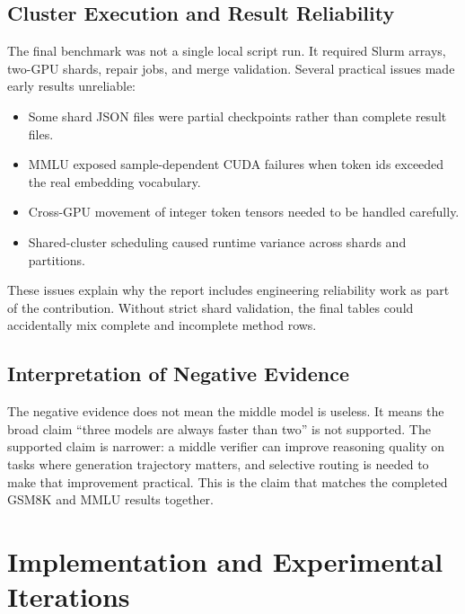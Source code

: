 \documentclass[11pt]{article}
\begin{document}
\subsection{Cluster Execution and Result Reliability}

The final benchmark was not a single local script run. It required Slurm arrays, two-GPU shards, repair jobs, and merge validation. Several practical issues made early results unreliable:

\begin{itemize}
  \item Some shard JSON files were partial checkpoints rather than complete result files.
  \item MMLU exposed sample-dependent CUDA failures when token ids exceeded the real embedding vocabulary.
  \item Cross-GPU movement of integer token tensors needed to be handled carefully.
  \item Shared-cluster scheduling caused runtime variance across shards and partitions.
\end{itemize}

These issues explain why the report includes engineering reliability work as part of the contribution. Without strict shard validation, the final tables could accidentally mix complete and incomplete method rows.

\subsection{Interpretation of Negative Evidence}

The negative evidence does not mean the middle model is useless. It means the broad claim ``three models are always faster than two'' is not supported. The supported claim is narrower: a middle verifier can improve reasoning quality on tasks where generation trajectory matters, and selective routing is needed to make that improvement practical. This is the claim that matches the completed GSM8K and MMLU results together.

\section{Implementation and Experimental Iterations}
\end{document}
